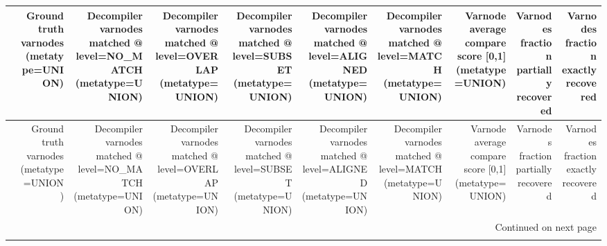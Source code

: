 \begin{longtable}{lrrrrrrrrr}
\toprule
{} &  Ground truth varnodes (metatype=UNION) &  Decompiler varnodes matched @ level=NO\_MATCH (metatype=UNION) &  Decompiler varnodes matched @ level=OVERLAP (metatype=UNION) &  Decompiler varnodes matched @ level=SUBSET (metatype=UNION) &  Decompiler varnodes matched @ level=ALIGNED (metatype=UNION) &  Decompiler varnodes matched @ level=MATCH (metatype=UNION) &  Varnode average compare score {[}0,1] (metatype=UNION) &  Varnodes fraction partially recovered &  Varnodes fraction exactly recovered \\
\midrule
\endfirsthead

\toprule
{} &  Ground truth varnodes (metatype=UNION) &  Decompiler varnodes matched @ level=NO\_MATCH (metatype=UNION) &  Decompiler varnodes matched @ level=OVERLAP (metatype=UNION) &  Decompiler varnodes matched @ level=SUBSET (metatype=UNION) &  Decompiler varnodes matched @ level=ALIGNED (metatype=UNION) &  Decompiler varnodes matched @ level=MATCH (metatype=UNION) &  Varnode average compare score {[}0,1] (metatype=UNION) &  Varnodes fraction partially recovered &  Varnodes fraction exactly recovered \\
\midrule
\endhead
\midrule
\multicolumn{10}{r}{{Continued on next page}} \\
\midrule
\endfoot


\end{longtable}
